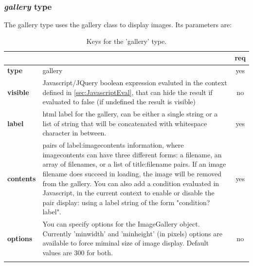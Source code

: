 \subsubsection{ \emph{gallery} type}

The gallery type uses the gallery class to display images. Its parameters are:

\begin{longtable}{|>{\bf}L{\linewidth}|L{\linewidth}|c|}
\hline
      &  & {\bf req} 
\tabularnewline \hline \hline
 type       & gallery  & yes \\ \hline
 visible    & Javascript/JQuery boolean expression evaluted in the context 
              defined in \ref{sec:JavascriptEval}, that can hide the result if
              evaluated to false (if undefined the result is visible)& no \\ \hline
 label      & html label for the gallery, can be either a single string or 
             a list of string that will be concatenated with whitespace character
              in between. & yes \\ \hline
 contents   & pairs of label:imagecontents information, where imagecontents can 
              have three different forms: a filename, an array of filenames, or
              a list of title:filename pairs. 
              If an image filename does succeed in loading,
              the image will be removed from the gallery. 
              You can also add a condition evaluated in Javascript,
              in the current context to enable or disable the pair display:
              using a label string of the form "condition?label".
            & yes \\ \hline
 options    & You can specify options for the ImageGallery object. Currently
              'minwidth' and 'minheight' (in pixels) options are available to force
              miminal size of image display. Default values are 300 for both.& no \\ \hline
\caption{Keys for the 'gallery' type.}
\end{longtable}

